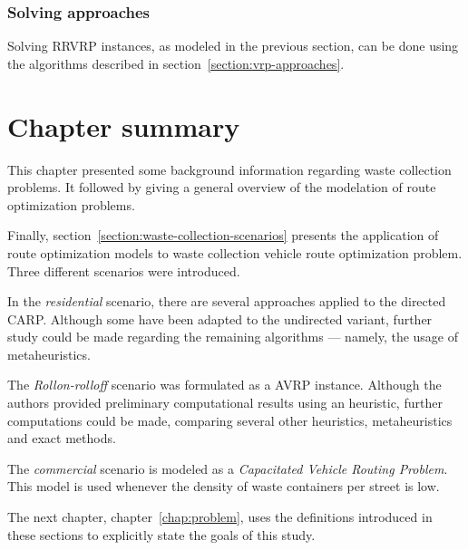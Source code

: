 \subsubsection{Solving approaches}
\label{section:rrvrp-approaches}

Solving RRVRP instances, as modeled in the previous section, can be done using
the algorithms described in section~\ref{section:vrp-approaches}.


\section{Chapter summary}

This chapter presented some background information regarding waste collection
problems. It followed by giving a general overview of the modelation of route
optimization problems.

Finally, section~\ref{section:waste-collection-scenarios} presents the
application of route optimization models to waste collection vehicle route
optimization problem. Three different scenarios were introduced.

In the \textit{residential} scenario, there are several approaches applied to
the directed CARP. Although some have been adapted to the undirected variant,
further study could be made regarding the remaining algorithms --- namely, the
usage of metaheuristics.

The \textit{Rollon-rolloff} scenario was formulated as a AVRP instance. Although
the authors provided preliminary computational results using an heuristic, further
computations could be made, comparing several other heuristics, metaheuristics and
exact methods.

The \textit{commercial} scenario is modeled as a \textit{Capacitated Vehicle
Routing Problem}. This model is used whenever the density of waste containers
per street is low.

The next chapter, chapter~\ref{chap:problem}, uses the definitions introduced in
these sections to explicitly state the goals of this study.
